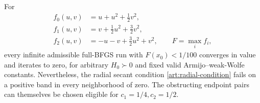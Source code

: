\begin{theorem}\label{art:nonradial-example}
For
\[
 \begin{aligned}
 f_0(u,v)&=u+u^2+\tfrac12v^2,\\
 f_1(u,v)&=v+\tfrac12u^2+\tfrac32v^2,\\
 f_2(u,v)&=-u-v+\tfrac32u^2+v^2,\qquad F=\max_i f_i,
 \end{aligned}
\]
every infinite admissible full-BFGS run with $F(x_0)<1/100$ converges in
value and iterates to zero, for arbitrary $H_0\succ0$ and fixed valid
Armijo--weak-Wolfe constants. Nevertheless, the radial secant condition
\eqref{art:radial-condition} fails on a positive band in every neighborhood
of zero. The obstructing endpoint pairs can themselves be chosen eligible
for $c_1=1/4,c_2=1/2$.
\end{theorem}

